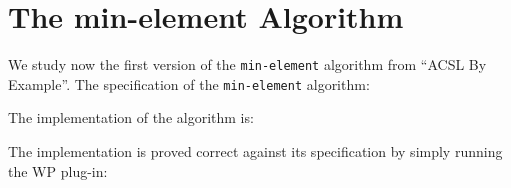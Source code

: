 \clearpage
\section{The \textsf{min-element} Algorithm}
\label{min-element}

We study now the first version of the \texttt{min-element}
algorithm from ``ACSL By Example''. 
The specification of the \texttt{min-element} algorithm:


The implementation of the algorithm is:


The implementation is proved correct against its specification by
simply running the \textsf{WP} plug-in: 

